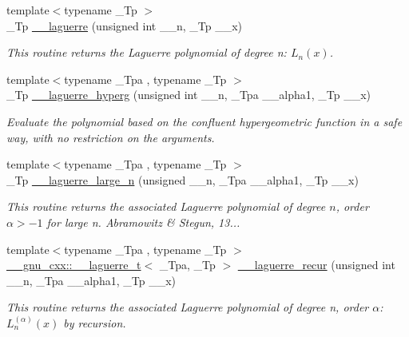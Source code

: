 \begin{DoxyCompactItemize}
{\footnotesize template$<$typename \+\_\+\+Tp $>$ }\\\+\_\+\+Tp \hyperlink{namespacestd_1_1____detail_aa714c4983a3cb7d9d18e0c2c5a8f6826}{\+\_\+\+\_\+laguerre} (unsigned int \+\_\+\+\_\+n, \+\_\+\+Tp \+\_\+\+\_\+x)
\begin{DoxyCompactList}\small\item\em This routine returns the Laguerre polynomial of degree n\+: $ L_n(x) $. \end{DoxyCompactList}\item 
{\footnotesize template$<$typename \+\_\+\+Tpa , typename \+\_\+\+Tp $>$ }\\\+\_\+\+Tp \hyperlink{namespacestd_1_1____detail_a7908be328a4546d77802076196ae4396}{\+\_\+\+\_\+laguerre\+\_\+hyperg} (unsigned int \+\_\+\+\_\+n, \+\_\+\+Tpa \+\_\+\+\_\+alpha1, \+\_\+\+Tp \+\_\+\+\_\+x)
\begin{DoxyCompactList}\small\item\em Evaluate the polynomial based on the confluent hypergeometric function in a safe way, with no restriction on the arguments. \end{DoxyCompactList}\item 
{\footnotesize template$<$typename \+\_\+\+Tpa , typename \+\_\+\+Tp $>$ }\\\+\_\+\+Tp \hyperlink{namespacestd_1_1____detail_abfce1c88345c266f5bcc9831766ed760}{\+\_\+\+\_\+laguerre\+\_\+large\+\_\+n} (unsigned \+\_\+\+\_\+n, \+\_\+\+Tpa \+\_\+\+\_\+alpha1, \+\_\+\+Tp \+\_\+\+\_\+x)
\begin{DoxyCompactList}\small\item\em This routine returns the associated Laguerre polynomial of degree $ n $, order $ \alpha > -1 $ for large n. Abramowitz \& Stegun, 13... \end{DoxyCompactList}\item 
{\footnotesize template$<$typename \+\_\+\+Tpa , typename \+\_\+\+Tp $>$ }\\\hyperlink{struct____gnu__cxx_1_1____laguerre__t}{\+\_\+\+\_\+gnu\+\_\+cxx\+::\+\_\+\+\_\+laguerre\+\_\+t}$<$ \+\_\+\+Tpa, \+\_\+\+Tp $>$ \hyperlink{namespacestd_1_1____detail_ab5344b00cf4ed8b39c9132ce0b9287af}{\+\_\+\+\_\+laguerre\+\_\+recur} (unsigned int \+\_\+\+\_\+n, \+\_\+\+Tpa \+\_\+\+\_\+alpha1, \+\_\+\+Tp \+\_\+\+\_\+x)
\begin{DoxyCompactList}\small\item\em This routine returns the associated Laguerre polynomial of degree {\ttfamily n}, order {\ttfamily $ \alpha $}\+: $ L_n^{(\alpha)}(x) $ by recursion. \end{DoxyCompactList}\item 

\end{DoxyCompactItemize}
